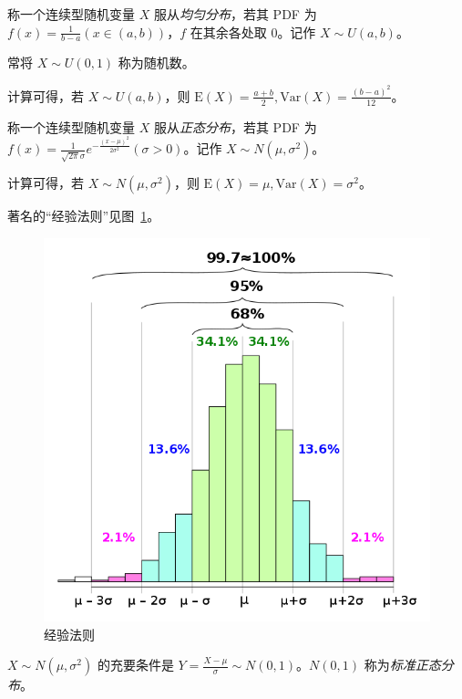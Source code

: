 \documentclass[../main.tex]{subfiles}
\begin{document}
\begin{definition}\label{def:2.5.1}
    称一个连续型随机变量 $X$ 服从\emph{均匀分布}，若其 PDF 为 $f(x)=\frac{1}{b-a}(x\in(a,b))$，$f$ 在其余各处取 $0$。记作 $X\sim U(a,b)$。
\end{definition}

常将 $X\sim U(0,1)$ 称为随机数。

计算可得，若 $X\sim U(a,b)$，则 $\mathrm{E}(X)=\frac{a+b}{2},\mathrm{Var}(X)=\frac{(b-a)^2}{12}$。

\begin{definition}\label{def:2.5.2}
    称一个连续型随机变量 $X$ 服从\emph{正态分布}，若其 PDF 为 $f(x)=\frac{1}{\sqrt{2\pi}\sigma}e^{-\frac{(x-\mu)^2}{2\sigma^2}}(\sigma>0)$。记作 $X\sim N(\mu,\sigma^2)$。
\end{definition}

计算可得，若 $X\sim N(\mu,\sigma^2)$，则 $\mathrm{E}(X)=\mu,\mathrm{Var}(X)=\sigma^2$。

著名的“经验法则”见图~\ref{fig:2.5.1}。

\begin{figure}[!h]
    \centering
    \includegraphics[scale=0.5]{figures/empirical_rule.png}
    \caption{经验法则}
    \label{fig:2.5.1}
\end{figure}

$X\sim N(\mu,\sigma^2)$ 的充要条件是 $Y=\frac{X-\mu}{\sigma}\sim N(0,1)$。$N(0,1)$ 称为\emph{标准正态分布}。
\end{document}
